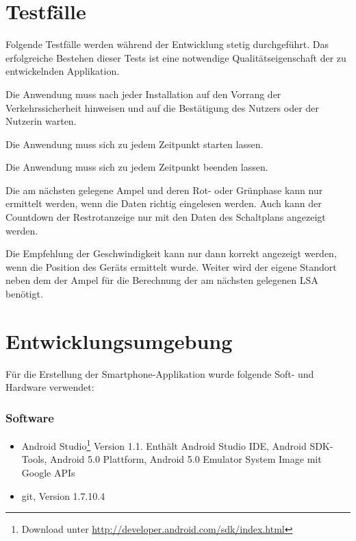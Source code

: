 \section{Testfälle}
Folgende Testfälle werden während der Entwicklung stetig durchgeführt. Das erfolgreiche Bestehen dieser Tests ist eine notwendige Qualitätseigenschaft der zu entwickelnden Applikation.
\begin{description}[leftmargin=0.7cm,style=nextline]
\item[Sicherheitshinweis:] 
Die Anwendung muss nach jeder Installation auf den Vorrang der Verkehrssicherheit hinweisen und auf die Bestätigung des Nutzers oder der Nutzerin warten.\\
\item[Anwendung starten:] 
Die Anwendung muss sich zu jedem Zeitpunkt starten lassen. \\
\item[Anwendung beenden:] 
Die Anwendung muss sich zu jedem Zeitpunkt beenden lassen. \\
\item[Einlesen der Datei:] 
Die am nächsten gelegene Ampel und deren Rot- oder Grünphase kann nur ermittelt werden, wenn die Daten richtig eingelesen werden. Auch kann der Countdown der Restrotanzeige nur mit den Daten des Schaltplans angezeigt werden.\\
\item[Ermittlung der Position:] 
Die Empfehlung der Geschwindigkeit kann nur dann korrekt angezeigt werden, wenn die Position des Geräts ermittelt wurde. Weiter wird der eigene Standort neben dem der Ampel für die Berechnung der am nächsten gelegenen \gls{LSA} benötigt.\\
\end{description}
\section{Entwicklungsumgebung}
Für die Erstellung der Smartphone-Applikation wurde folgende Soft- und Hardware verwendet:
\subsubsection{Software}
\begin{itemize}
	\item Android Studio\footnote{ Download unter \url{http://developer.android.com/sdk/index.html}} Version 1.1. Enthält Android Studio IDE, Android \gls{SDK}-Tools, Android 5.0 Plattform, Android 5.0 Emulator System Image mit Google \glspl{API}
	\item git, Version 1.7.10.4
\end{itemize}
